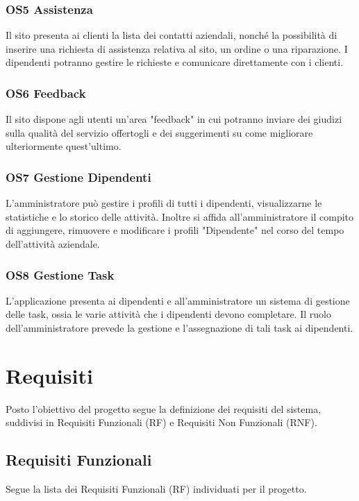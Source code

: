 \documentclass{report}
\begin{document}
\subsection*{OS5 Assistenza}
Il sito presenta ai clienti la lista dei contatti aziendali, nonché la possibilità di inserire una richiesta di assistenza relativa al sito, un ordine o una riparazione. I dipendenti potranno gestire le richieste e comunicare direttamente con i clienti.


\subsection*{OS6 Feedback} %
Il sito dispone agli utenti un'area "feedback" in cui potranno inviare dei giudizi sulla qualità del servizio offertogli e dei suggerimenti su come migliorare ulteriormente quest'ultimo.

\subsection*{OS7 Gestione Dipendenti}

L'amministratore può gestire i profili di tutti i dipendenti, visualizzarne le statistiche e lo storico delle attività. Inoltre si affida all'amministratore il compito di aggiungere, rimuovere e modificare i profili "Dipendente" nel corso del tempo dell'attività aziendale.


\subsection*{OS8 Gestione Task}%
L’applicazione presenta ai dipendenti e all'amministratore un sistema di gestione delle task, ossia le varie attività che i dipendenti devono completare. Il ruolo dell'amministratore prevede la gestione e l'assegnazione di tali task ai dipendenti.


\chapter{Requisiti}
Posto l’obiettivo del progetto segue la definizione dei requisiti del sistema, suddivisi in Requisiti Funzionali (RF) e Requisiti Non Funzionali (RNF).



\section{Requisiti Funzionali}
Segue la lista dei Requisiti Funzionali (RF) individuati per il progetto.
\end{document}
